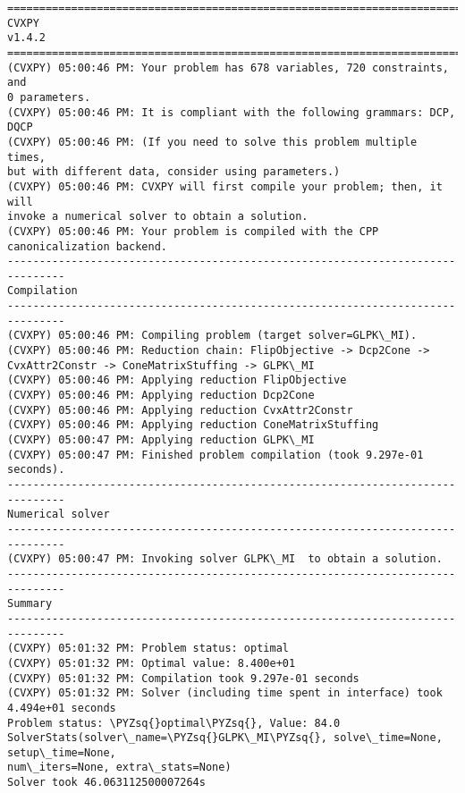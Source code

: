 \begin{Verbatim}[commandchars=\\\{\}]
===============================================================================
CVXPY
v1.4.2
===============================================================================
(CVXPY) 05:00:46 PM: Your problem has 678 variables, 720 constraints, and
0 parameters.
(CVXPY) 05:00:46 PM: It is compliant with the following grammars: DCP,
DQCP
(CVXPY) 05:00:46 PM: (If you need to solve this problem multiple times,
but with different data, consider using parameters.)
(CVXPY) 05:00:46 PM: CVXPY will first compile your problem; then, it will
invoke a numerical solver to obtain a solution.
(CVXPY) 05:00:46 PM: Your problem is compiled with the CPP
canonicalization backend.
-------------------------------------------------------------------------------
Compilation
-------------------------------------------------------------------------------
(CVXPY) 05:00:46 PM: Compiling problem (target solver=GLPK\_MI).
(CVXPY) 05:00:46 PM: Reduction chain: FlipObjective -> Dcp2Cone ->
CvxAttr2Constr -> ConeMatrixStuffing -> GLPK\_MI
(CVXPY) 05:00:46 PM: Applying reduction FlipObjective
(CVXPY) 05:00:46 PM: Applying reduction Dcp2Cone
(CVXPY) 05:00:46 PM: Applying reduction CvxAttr2Constr
(CVXPY) 05:00:46 PM: Applying reduction ConeMatrixStuffing
(CVXPY) 05:00:47 PM: Applying reduction GLPK\_MI
(CVXPY) 05:00:47 PM: Finished problem compilation (took 9.297e-01
seconds).
-------------------------------------------------------------------------------
Numerical solver
-------------------------------------------------------------------------------
(CVXPY) 05:00:47 PM: Invoking solver GLPK\_MI  to obtain a solution.
-------------------------------------------------------------------------------
Summary
-------------------------------------------------------------------------------
(CVXPY) 05:01:32 PM: Problem status: optimal
(CVXPY) 05:01:32 PM: Optimal value: 8.400e+01
(CVXPY) 05:01:32 PM: Compilation took 9.297e-01 seconds
(CVXPY) 05:01:32 PM: Solver (including time spent in interface) took
4.494e+01 seconds
Problem status: \PYZsq{}optimal\PYZsq{}, Value: 84.0
SolverStats(solver\_name=\PYZsq{}GLPK\_MI\PYZsq{}, solve\_time=None, setup\_time=None,
num\_iters=None, extra\_stats=None)
Solver took 46.063112500007264s
\end{Verbatim}

